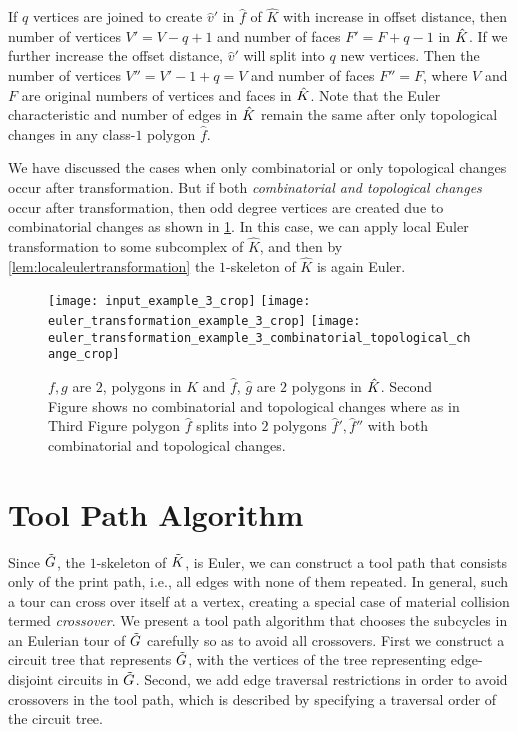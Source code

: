 If $q$ vertices are joined to create $\hat{v}'$ in $\hat{f}$ of $\hat{K}$ with increase in offset distance, then number of vertices $V' = V - q + 1$ and number of faces $F' = F + q -1 $ in $\hat{K}$.
If we further increase the offset distance, $\hat{v}'$ will split into $q$ new vertices.
Then the number of vertices $V'' = V' - 1 + q = V$ and number of faces $F'' = F$, where $V$ and $F$ are original numbers of vertices and faces in $\hat{K}$.
Note that the Euler characteristic and number of edges in $\hat{K}$ remain the same after only topological changes in any class-$1$ polygon $\hat{f}$.  
	
We have discussed the cases when only combinatorial or only topological changes occur after transformation.
But if both \textit{combinatorial and topological changes} occur after transformation, then odd degree vertices are created due to combinatorial changes as shown in \cref{fig:combinatotopologychange}.
In this case, we can apply local Euler transformation to some subcomplex of $\hat{K}$, and then by \cref{lem:localeulertransformation} the $1$-skeleton of $\hat{K}$ is again Euler. 
	    
\begin{figure}[ht!] 
	\centering
	\texttt{[image: input\_example\_3\_crop]}
	\quad
	\texttt{[image: euler\_transformation\_example\_3\_crop]}
	\texttt{[image: euler\_transformation\_example\_3\_combinatorial\_topological\_change\_crop]}
	\caption{\label{fig:combinatotopologychange} $f, g$ are $2$, polygons in $K$ and $\hat{f}$, $\hat{g}$ are $2$ polygons in $\hat{K}$. Second Figure shows no combinatorial and topological changes where as in Third Figure polygon $\hat{f}$ splits into $2$ polygons $\hat{f}', \hat{f}''$ with  both combinatorial and topological changes.}
\end{figure}

\section{Tool Path Algorithm}\label{sec:toolpathalgo}
Since $\tilde{G}$, the $1$-skeleton of $\tilde{K}$, is Euler, we can construct a tool path that consists only of the print path, i.e., all edges with none of them repeated.
In general, such a tour can cross over itself at a vertex, creating a special case of material collision termed \textit{crossover}.  
We present a tool path algorithm that chooses the subcycles in an Eulerian tour of $\tilde{G}$ carefully so as to avoid all crossovers.
First we construct a circuit tree that represents $\tilde{G}$, with the vertices of the tree representing edge-disjoint circuits in $\tilde{G}$.
Second, we add edge traversal restrictions in order to avoid crossovers in the tool path, which is described by specifying a traversal order of the circuit tree. %
